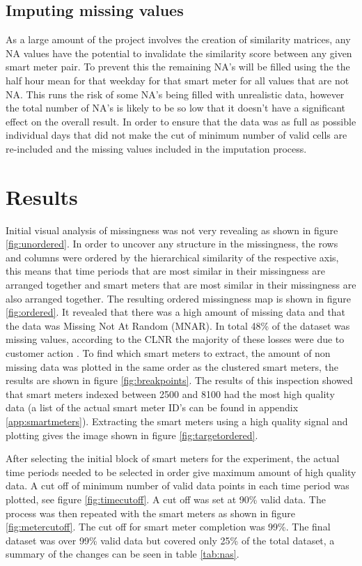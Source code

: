 \subsection{Imputing missing values}
\label{sec:imputation}
As a large amount of the project involves the creation of similarity matrices, any NA values have the potential to invalidate the similarity score between any given smart meter pair. To prevent this the remaining NA's will be filled using the the half hour mean for that weekday for that smart meter for all values that are not NA. This runs the risk of some NA's being filled with unrealistic data, however the total number of NA's is likely to be so low that it doesn't have a significant effect on the overall result. In order to ensure that the data was as full as possible individual days that did not make the cut of minimum number of valid cells are re-included and the missing values included in the imputation process.

\section{Results}

Initial visual analysis of missingness was not very revealing as shown in figure \ref{fig:unordered}. In order to uncover any structure in the missingness, the rows and columns were ordered by the hierarchical similarity of the respective axis, this means that time periods that are most similar in their missingness are arranged together and smart meters that are most similar in their missingness are also arranged together. The resulting ordered missingness map is shown in figure \ref{fig:ordered}. It revealed that there was a high amount of missing data and that the data was Missing Not At Random (MNAR). In total 48\% of the dataset was missing values, according to the CLNR the majority of these losses were due to customer action \cite{howard2015}. To find which smart meters to extract, the amount of non missing data was plotted in the same order as the clustered smart meters, the results are shown in figure \ref{fig:breakpoints}. The results of this inspection showed that smart meters indexed between 2500 and 8100 had the most high quality data (a list of the actual smart meter ID's can be found in appendix \ref{app:smartmeters}). Extracting the smart meters using a high quality signal and plotting gives the image shown in figure \ref{fig:targetordered}. 

After selecting the initial block of smart meters for the experiment, the actual time periods needed to be selected in order give maximum amount of high quality data. A cut off of minimum number of valid data points in each time period was plotted, see figure \ref{fig:timecutoff}. A cut off was set at 90\% valid data. The process was then repeated with the smart meters as shown in figure \ref{fig:metercutoff}. The cut off for smart meter completion was 99\%. The final dataset was over 99\% valid data but covered only 25\% of the total dataset, a summary of the changes can be seen in table \ref{tab:nas}.


